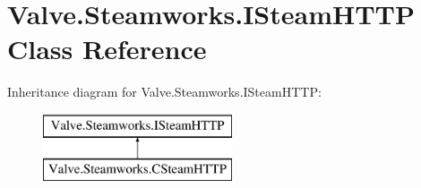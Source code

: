 \hypertarget{classValve_1_1Steamworks_1_1ISteamHTTP}{}\section{Valve.\+Steamworks.\+I\+Steam\+H\+T\+T\+P Class Reference}
\label{classValve_1_1Steamworks_1_1ISteamHTTP}
Inheritance diagram for Valve.\+Steamworks.\+I\+Steam\+H\+T\+T\+P\+:\begin{figure}[H]
\begin{center}
\leavevmode
\includegraphics[height=2.000000cm]{classValve_1_1Steamworks_1_1ISteamHTTP}
\end{center}
\end{figure}
